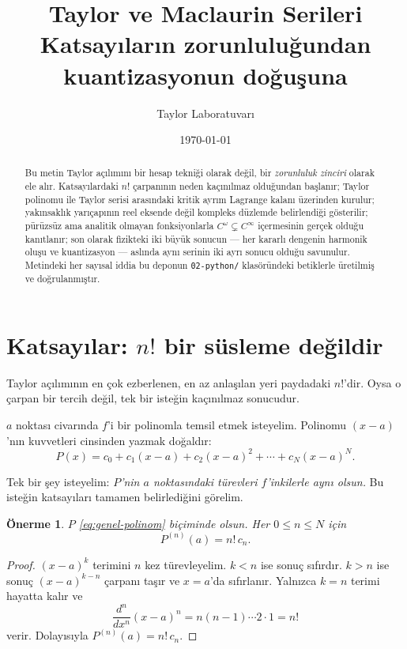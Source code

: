 \documentclass[11pt,a4paper]{article}
\title{\textbf{Taylor ve Maclaurin Serileri}\\[0.4em]
\large Katsayıların zorunluluğundan kuantizasyonun doğuşuna}
\author{Taylor Laboratuvarı}
\date{\today}
\theoremstyle{plain}
\newtheorem{onerme}[teorem]{Önerme}
\theoremstyle{definition}
\theoremstyle{remark}
\begin{document}
\maketitle

\begin{abstract}
Bu metin Taylor açılımını bir hesap tekniği olarak değil, bir \emph{zorunluluk
zinciri} olarak ele alır. Katsayılardaki $n!$ çarpanının neden kaçınılmaz
olduğundan başlanır; Taylor polinomu ile Taylor serisi arasındaki kritik ayrım
Lagrange kalanı üzerinden kurulur; yakınsaklık yarıçapının reel eksende değil
kompleks düzlemde belirlendiği gösterilir; pürüzsüz ama analitik olmayan
fonksiyonlarla $C^\omega \subsetneq C^\infty$ içermesinin gerçek olduğu
kanıtlanır; son olarak fizikteki iki büyük sonucun --- her kararlı dengenin
harmonik oluşu ve kuantizasyon --- aslında aynı serinin iki ayrı sonucu olduğu
savunulur. Metindeki her sayısal iddia bu deponun \texttt{02-python/}
klasöründeki betiklerle üretilmiş ve doğrulanmıştır.
\end{abstract}

\tableofcontents
\bigskip

\section{Katsayılar: \texorpdfstring{$n!$}{n!} bir süsleme değildir}

Taylor açılımının en çok ezberlenen, en az anlaşılan yeri paydadaki $n!$'dir.
Oysa o çarpan bir tercih değil, tek bir isteğin kaçınılmaz sonucudur.

$a$ noktası civarında $f$'i bir polinomla temsil etmek isteyelim. Polinomu
$(x-a)$'nın kuvvetleri cinsinden yazmak doğaldır:
\begin{equation}\label{eq:genel-polinom}
  P(x) = c_0 + c_1(x-a) + c_2(x-a)^2 + \cdots + c_N(x-a)^N .
\end{equation}

Tek bir şey isteyelim: \emph{$P$'nin $a$ noktasındaki türevleri $f$'inkilerle
aynı olsun.} Bu isteğin katsayıları tamamen belirlediğini görelim.

\begin{onerme}\label{onerme:katsayilar}
$P$ \eqref{eq:genel-polinom} biçiminde olsun. Her $0 \le n \le N$ için
\[
  P^{(n)}(a) = n!\,c_n .
\]
\end{onerme}

\begin{proof}
$(x-a)^k$ terimini $n$ kez türevleyelim. $k < n$ ise sonuç sıfırdır. $k > n$
ise sonuç $(x-a)^{k-n}$ çarpanı taşır ve $x=a$'da sıfırlanır. Yalnızca $k=n$
terimi hayatta kalır ve
\[
  \frac{d^n}{dx^n}(x-a)^n = n(n-1)\cdots 2\cdot 1 = n!
\]
verir. Dolayısıyla $P^{(n)}(a) = n!\,c_n$.
\end{proof}
\end{document}
